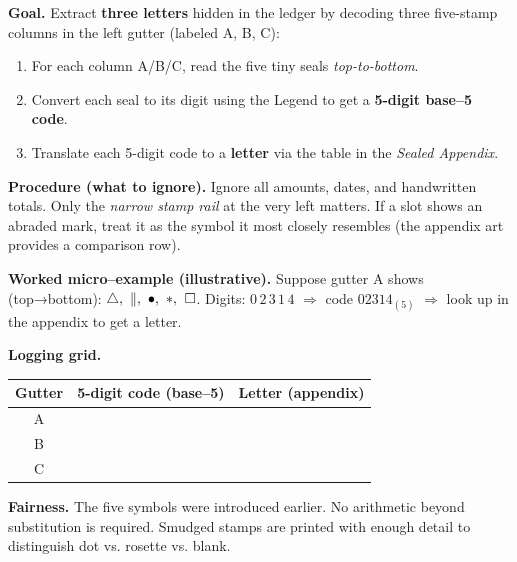\documentclass[11pt]{article}
\numberwithin{equation}{section} %
\theoremstyle{plain} %
\theoremstyle{definition} %
\theoremstyle{remark} %
\begin{document}
\medskip
\noindent\textbf{Goal.} Extract \textbf{three letters} hidden in the ledger by decoding three five-stamp columns in the left gutter (labeled \textsc{A}, \textsc{B}, \textsc{C}):

\begin{enumerate}\setlength\itemsep{0.25em}
  \item For each column \textsc{A}/\textsc{B}/\textsc{C}, read the five tiny seals \emph{top-to-bottom}.
  \item Convert each seal to its digit using the Legend to get a \textbf{5-digit base–5 code}.
  \item Translate each 5-digit code to a \textbf{letter} via the table in the \emph{Sealed Appendix}.
\end{enumerate}

\medskip
\noindent\textbf{Procedure (what to ignore).} Ignore all amounts, dates, and handwritten totals. Only the \emph{narrow stamp rail} at the very left matters. If a slot shows an abraded mark, treat it as the symbol it most closely resembles (the appendix art provides a comparison row).

\medskip
\noindent\textbf{Worked micro–example (illustrative).}  
Suppose gutter \textsc{A} shows (top→bottom): \(\triangle,\ \Vert,\ \bullet,\ \large\ast,\ \square\).  
Digits: \(0\,2\,3\,1\,4\) \(\Rightarrow\) code \(02314_{(5)}\) \(\Rightarrow\) look up in the appendix to get a letter.

\medskip
\noindent\textbf{Logging grid.}
\begin{center}
\begin{tabular}{c|c|c}
\textbf{Gutter} & \textbf{5-digit code (base–5)} & \textbf{Letter (appendix)} \\
\hline
A & \hspace{3.5cm} & \hspace{1.2cm} \\
B & \hspace{3.5cm} & \hspace{1.2cm} \\
C & \hspace{3.5cm} & \hspace{1.2cm} \\
\end{tabular}
\end{center}

\medskip
\noindent\textbf{Fairness.} The five symbols were introduced earlier. No arithmetic beyond substitution is required. Smudged stamps are printed with enough detail to distinguish dot vs. rosette vs. blank.
\end{document}
